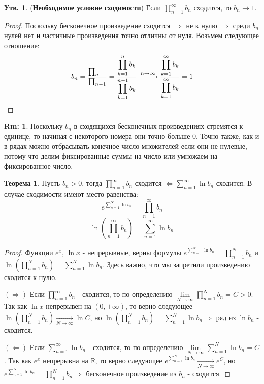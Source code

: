 \documentclass[12pt]{article}
\newcommand{\MR}{\mathbb{R}}
\theoremstyle{definition}
\newtheorem{rem}{Rm:}
\newtheorem{prop}{Утв.}
\newtheorem{theorem}{Теорема}
\begin{document}
\begin{prop}(\textbf{Необходимое условие сходимости})
	Если $ \displaystyle\prod\limits_{n=1}^{\infty}b_n$ сходится, то $b_n \to 1$.
\end{prop}
\begin{proof}
	Поскольку бесконечное произведение сходится $\Rightarrow$ не к нулю $\Rightarrow$ среди $b_n$ нулей нет и частичные произведения точно отличны от нуля. Возьмем следующее отношение:
	$$
		b_n = \dfrac{ \prod_n\hfill}{ \prod_{n-1}} = \dfrac{\displaystyle \prod\limits_{k=1}^{n} b_k}{\displaystyle \prod\limits_{k=1}^{n-1} b_k} \xrightarrow{n \to \infty} \dfrac{\displaystyle \prod\limits_{k=1}^{\infty} b_k}{\displaystyle \prod\limits_{k=1}^{\infty} b_k} = 1
	$$
\end{proof}
\begin{rem}
	Поскольку $b_n$ в сходящихся бесконечных произведениях стремятся к единице, то начиная с некоторого номера они точно больше $0$. Точно также, как и в рядах можно отбрасывать конечное число множителей если они не нулевые, потому что делим фиксированные суммы на число или умножаем на фиксированное число.
\end{rem}
\begin{theorem}
	Пусть $b_n > 0$, тогда $\displaystyle \prod\limits_{n=1}^{\infty}b_n$ сходится $\Leftrightarrow \displaystyle\sum\limits_{n=1}^{\infty}\ln{b_n}$ сходится. В случае сходимости имеют место равенства:
	$$
		e^{ \sum\limits_{n = 1}^{\infty}\ln b_n} = \prod\limits_{n=1}^{\infty}b_n
	$$
	$$
		\ln\left(\prod\limits_{n=1}^{\infty}b_n\right) = \sum\limits_{n = 1}^{\infty}\ln b_n
	$$
\end{theorem}
\begin{proof}
	Функции $e^x, \, \ln x$ - непрерывные, верны формулы $e^{ \sum\limits_{n = 1}^{N}\ln b_n} = \displaystyle \prod\limits_{n = 1}^{N}b_n$ и $\ln\left(\displaystyle\prod\limits_{n=1}^{N}b_n\right) = \displaystyle \sum\limits_{n = 1}^{N }\ln b_n$. Здесь важно, что мы запретили произведению сходится к нулю. 
	
	$(\Rightarrow)$ Если $\displaystyle \prod\limits_{n = 1}^{\infty}b_n$ - сходится, то по определению $\lim\limits_{N\to \infty} \displaystyle \prod\limits_{n = 1}^{N}b_n = C > 0$. Так как $\ln x$ непрерывен на $(0, +\infty)$, то верно следующее $\ln\left(\prod\limits_{n=1}^{N}b_n\right) \xrightarrow[N \to \infty]{} \ln C$, но $\ln\left(\prod\limits_{n=1}^{N}b_n\right) = \displaystyle \sum\limits_{n = 1}^{N }\ln b_n \Rightarrow$ ряд из $\ln b_n$ - сходится.
	
	$(\Leftarrow)$ Если $\displaystyle \sum\limits_{n = 1}^{\infty}\ln b_n$ - сходится, то по определению $\lim\limits_{N\to \infty} \displaystyle \sum\limits_{n = 1}^{N}\ln b_n = C$. Так как $e^x$ непрерывна на $\MR$, то верно следующее $e^{ \sum\limits_{n = 1}^{N}\ln b_n} \xrightarrow[N \to \infty]{} e^C$, но $e^{ \sum\limits_{n = 1}^{N}\ln b_n} =\displaystyle \prod\limits_{n = 1}^{N}b_n \Rightarrow$ бесконечное произведение из $b_n$ - сходится.
\end{proof}
\end{document}
